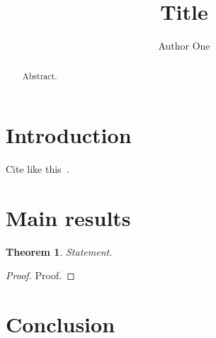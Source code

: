 \documentclass[11pt]{amsart}
\title{Title}
\author{Author One}
\newtheorem{theorem}{Theorem}[section]
\theoremstyle{definition}\newtheorem{definition}[theorem]{Definition}
\theoremstyle{remark}\newtheorem{remark}[theorem]{Remark}
\begin{document}
\begin{abstract}
Abstract.
\end{abstract}
\maketitle
\section{Introduction}
Cite like this~\cite{example2026}.
\section{Main results}
\begin{theorem}\label{thm:main}
Statement.
\end{theorem}
\begin{proof}
Proof.
\end{proof}
\section{Conclusion}


\end{document}
